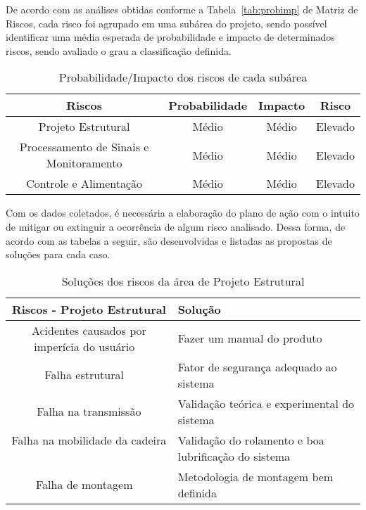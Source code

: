 De acordo com as análises obtidas conforme a Tabela~\ref{tab:probimp} de Matriz de Riscos,
cada risco foi agrupado em uma subárea do projeto, sendo possível identificar uma
média esperada de probabilidade e impacto de determinados riscos, sendo avaliado o
grau a classificação definida.

\begin{table}[h]
\centering
\vspace{0.5cm}
\begin{tabular}{|c|c|c|c|}
\hline
    Riscos                    & Probabilidade & Impacto & Risco \\
\hline
    Projeto Estrutural                 & Médio         & Médio & Elevado \\
    Processamento de Sinais e Monitoramento  & Médio         & Médio & Elevado \\
    Controle e Alimentação               & Médio         & Médio & Elevado \\
\hline
\end{tabular}
\caption{Probabilidade/Impacto dos riscos de cada subárea}
\label{tab:probimparea}
\end{table}

Com os dados coletados, é necessária a elaboração do plano de ação com o
intuito de mitigar ou extinguir a ocorrência de algum risco analisado. Dessa forma, de
acordo com as tabelas a seguir, são desenvolvidas e listadas as propostas de soluções
para cada caso.

\begin{table}[h]
\centering
\vspace{0.5cm}
\begin{tabular}{|c|p{8cm}|}
\hline
Riscos - Projeto Estrutural                                     & Solução \\
\hline
Acidentes causados por imperícia do usuário            & Fazer um manual do produto \\
Falha estrutural                                       & Fator de segurança adequado ao sistema \\
Falha na transmissão                                   & Validação teórica e experimental do sistema \\
Falha na mobilidade da cadeira                         & Validação do rolamento e boa lubrificação do sistema \\
Falha de montagem                                      & Metodologia de montagem bem definida \\
\hline
\end{tabular}
\caption{Soluções dos riscos da área de Projeto Estrutural}
\label{tab:riscosubareaest}
\end{table}

